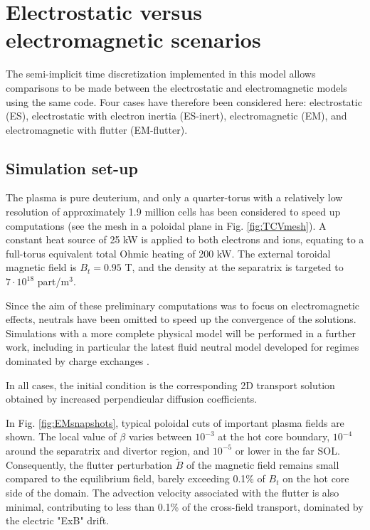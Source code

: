 \section{Electrostatic versus electromagnetic scenarios}

The semi-implicit time discretization implemented in this model allows comparisons to be made between the electrostatic and electromagnetic models using the same code. Four cases have therefore been considered here: electrostatic (ES), electrostatic with electron inertia (ES-inert), electromagnetic (EM), and electromagnetic with flutter (EM-flutter).

\subsection{Simulation set-up}

The plasma is pure deuterium, and only a quarter-torus with a relatively low resolution of approximately 1.9 million cells has been considered to speed up computations (see the mesh in a poloidal plane in Fig. \ref{fig:TCVmesh}). A constant heat source of 25 kW is applied to both electrons and ions, equating to a full-torus equivalent total Ohmic heating of 200 kW. The external toroidal magnetic field is $B_t = 0.95$ T, and the density at the separatrix is targeted to $7 \cdot 10^{18}$ part/m$^3$. \newline

Since the aim of these preliminary computations was to focus on electromagnetic effects, neutrals have been omitted to speed up the convergence of the solutions. Simulations with a more complete physical model will be performed in a further work, including in particular the latest fluid neutral model \cite{quadri2024} developed for regimes dominated by charge exchanges \cite{horsten2017}. \newline

In all cases, the initial condition is the corresponding 2D transport solution obtained by increased perpendicular diffusion coefficients. \newline

In Fig. \ref{fig:EMsnapshots}, typical poloidal cuts of important plasma fields are shown. The local value of $\beta$ varies between $10^{-3}$ at the hot core boundary, $10^{-4}$ around the separatrix and divertor region, and $10^{-5}$ or lower in the far SOL. Consequently, the flutter perturbation $\tilde{B}$ of the magnetic field remains small compared to the equilibrium field, barely exceeding 0.1\% of $B_t$ on the hot core side of the domain. The advection velocity associated with the flutter is also minimal, contributing to less than 0.1\% of the cross-field transport, dominated by the electric "ExB" drift. \newline

